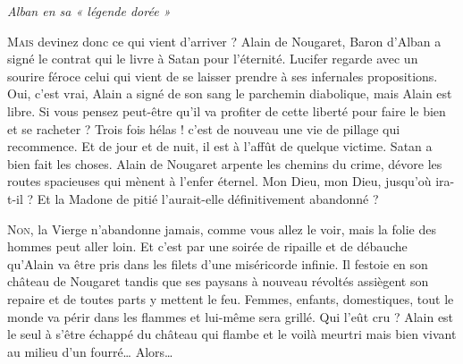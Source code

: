
\begin{center}
    {\Large\itshape Alban en sa « légende dorée »}
\end{center}

\medskip

\lettrine[lines=2]{M}{ais} devinez donc ce qui vient d’arriver ? Alain de Nougaret,
Baron d’Alban a signé le contrat qui le livre à Satan pour l’éternité.
Lucifer regarde avec un sourire féroce celui qui vient de se laisser prendre
à ses infernales propositions. Oui, c’est vrai, Alain a signé de son sang
le parchemin diabolique, mais Alain est libre. Si vous pensez peut-être
qu’il va profiter de cette liberté pour faire le bien et se racheter ?
Trois fois hélas ! c’est de nouveau une vie de pillage qui recommence.
Et de jour et de nuit, il est à l’affût de quelque victime. Satan a bien
fait les choses. Alain de Nougaret arpente les chemins du crime, dévore
les routes spacieuses qui mènent à l’enfer éternel. Mon Dieu, mon Dieu,
jusqu’où ira-t-il ? Et la Madone de pitié l’aurait-elle définitivement
abandonné ?

\medskip

\lettrine[lines=2]{N}{on}, la Vierge n’abandonne jamais, comme vous allez le voir,
mais la folie des hommes peut aller loin. Et c’est par une soirée de ripaille
et de débauche qu’Alain va être pris dans les filets d’une miséricorde infinie.
Il festoie en son château de Nougaret tandis que ses paysans à nouveau révoltés
assiègent son repaire et de toutes parts y mettent le feu. Femmes, enfants,
domestiques, tout le monde va périr dans les flammes et lui-même sera grillé.
Qui l’eût cru ? Alain est le seul à s’être échappé du château qui flambe et
le voilà meurtri mais bien vivant au milieu d’un fourré… Alors…
